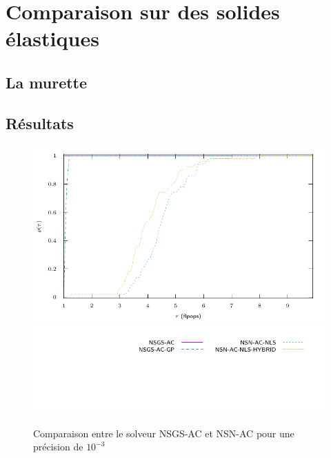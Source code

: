 \documentclass{CSMA2017}
\begin{document}
\section{Comparaison sur des solides élastiques}

\subsection{La murette}
\subsection{Résultats}
\begin{figure}
  \centering
  \includegraphics{figure/LowWall_FEM.1e-3.with_guess/simple/profile-LMGC_LowWall_FEM.pdf}
  \includegraphics{figure/LowWall_FEM.1e-3.with_guess/simple/profile-LMGC_LowWall_FEM_legend.pdf}
  \caption{Comparaison entre le solveur NSGS-AC et NSN-AC pour une précision de $10^{-3}$}
  \label{fig:LowWall_FEM.1e-3.simple}
\end{figure}
\end{document}
